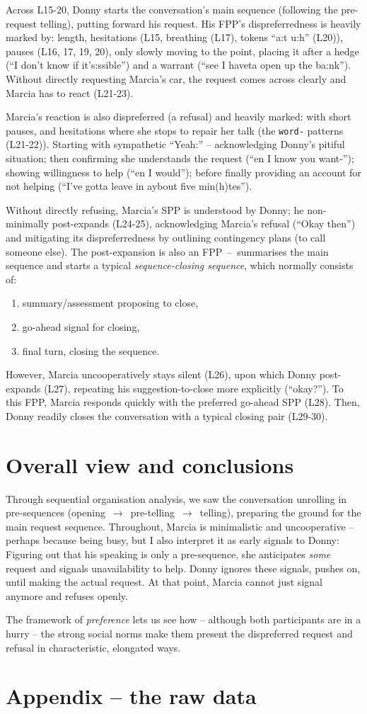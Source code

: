 \documentclass[11pt]{article}
\begin{document}
{	Across L15-20, Donny starts the conversation's main sequence (following the pre-request telling), putting forward his request. His FPP's dispreferredness is heavily marked by: length, hesitations (L15, breathing (L17), tokens ``a:t u:h'' (L20)), pauses (L16, 17, 19, 20), only slowly moving to the point, placing it after a hedge (``I don't know if it's:ssible'') and a warrant (``see I haveta open up the ba:nk''). Without directly requesting Marcia's car, the request comes across clearly and Marcia has to react (L21-23).

	Marcia's reaction is also dispreferred (a refusal) and heavily marked: with short pauses, and hesitations where she stops to repair her talk (the \verb|word-| patterns (L21-22)). Starting with sympathetic ``Yeah:'' -- acknowledging Donny's pitiful situation; then confirming she understands the request (``en I know you want-''); showing willingness to help (``en I would''); before finally providing an account for not helping (``I've gotta leave in aybout five min(h)tes'').

	Without directly refusing, Marcia's SPP is understood by Donny; he non-minimally post-expands (L24-25), acknowledging Marcia's refusal (``Okay then'') and mitigating its dispreferredness by outlining contingency plans (to call someone else). The post-expansion is also an FPP~--~summarises the main sequence and starts a typical \textit{sequence-closing sequence}, which \citep[p.~168]{Liddicoat_2007} normally consists of:
	\begin{enumerate}
		\item summary/assessment proposing to close,
		\item go-ahead signal for closing,
		\item final turn, closing the sequence.
	\end{enumerate}
	However, Marcia uncooperatively stays silent (L26), upon which Donny post-expands (L27), repeating his suggestion-to-close more explicitly (``okay?''). To this FPP, Marcia responds quickly with the preferred go-ahead SPP (L28). Then, Donny readily closes the conversation with a typical closing pair (L29-30).
}

\section*{Overall view and conclusions}{
	Through sequential organisation analysis, we saw the conversation unrolling in pre-sequences (opening~$\rightarrow$~pre-telling~$\rightarrow$~telling), preparing the ground for the main request sequence.
	Throughout, Marcia is minimalistic and uncooperative -- perhaps because being busy, but I also interpret it as early signals to Donny: 
	Figuring out that his speaking is only a pre-sequence, she anticipates \textit{some} request and signals unavailability to help.
	Donny ignores these signals, pushes on, until making the actual request.
	At that point, Marcia cannot just signal anymore and refuses openly.

	The framework of \textit{preference} lets us see how -- although both participants are in a hurry -- the strong social norms make them present the dispreferred request and refusal in characteristic, elongated ways.
}




\clearpage
\section*{Appendix -- the raw data}{
	
}
\end{document}
